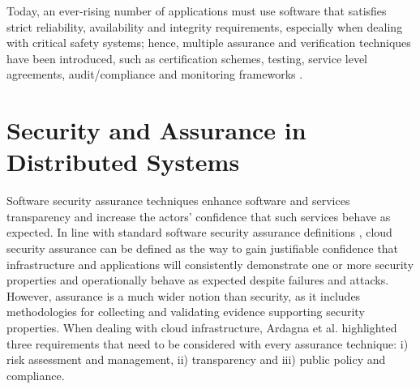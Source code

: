 Today, an ever-rising number of applications must use software that satisfies strict reliability, availability and integrity requirements, especially when dealing with critical safety systems; hence, multiple assurance and verification techniques have been introduced, such as certification schemes, testing, service level agreements, audit/compliance and monitoring frameworks \cite{ardagna2015security}. 


\section{Security and Assurance in Distributed Systems}
Software security assurance techniques enhance software and services transparency \cite{ardagna2014management} and increase the actors' confidence that such services behave as expected. In line with standard software security assurance definitions \cite{goertzel2007software}, cloud security assurance can be defined as the way to gain justifiable confidence that infrastructure and applications will consistently demonstrate one or more security properties and operationally behave as expected despite failures and attacks. However, assurance is a much wider notion than security, as it includes methodologies for collecting and validating evidence supporting security properties. When dealing with cloud infrastructure, Ardagna et al. \cite{article} highlighted three requirements that need to be considered with every assurance technique: i) risk assessment and management, ii) transparency and iii) public policy and compliance. 

